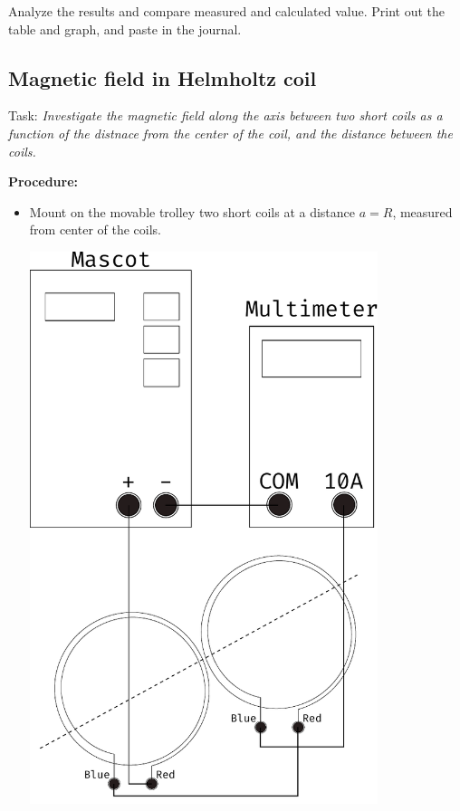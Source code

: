 \documentclass[../Elmag-labhefte-2020.tex]{subfiles}
\begin{document}
Analyze the results and compare measured and calculated value. Print out the table and graph, and paste in the journal.

\subsection{Magnetic field in Helmholtz coil}

Task:
\emph{Investigate the magnetic field along the axis between two short coils as a function of the distnace from the center of the coil, and the distance between the coils.}
 
\textbf{Procedure:}
\begin{itemize}
    \item Mount on the movable trolley two short coils at a distance $a = R$, measured from center of the coils.
\begin{marginfigure}
  \centering
  \includegraphics[width=0.8\textwidth]{fig/circuit_double_coil}
        

\end{marginfigure}
\end{itemize}
\end{document}
